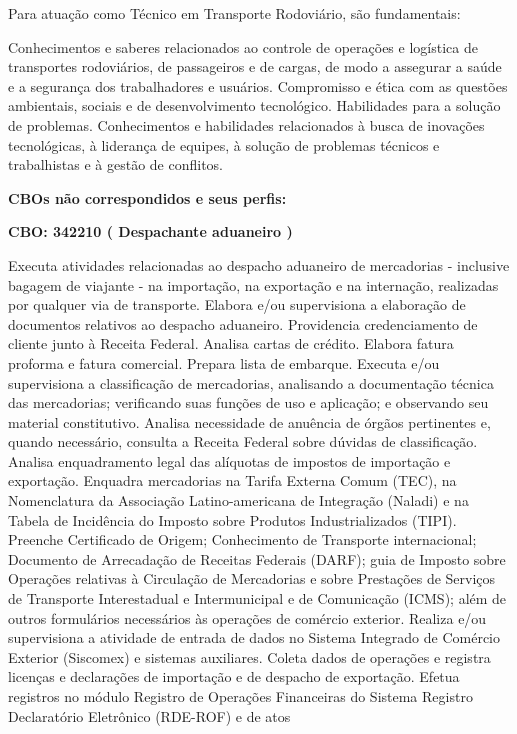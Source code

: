 \documentclass[
]{article}
\begin{document}
Para atuação como Técnico em Transporte Rodoviário, são fundamentais:

Conhecimentos e saberes relacionados ao controle de operações e
logística de transportes rodoviários, de passageiros e de cargas, de
modo a assegurar a saúde e a segurança dos trabalhadores e usuários.
Compromisso e ética com as questões ambientais, sociais e de
desenvolvimento tecnológico. Habilidades para a solução de problemas.
Conhecimentos e habilidades relacionados à busca de inovações
tecnológicas, à liderança de equipes, à solução de problemas técnicos e
trabalhistas e à gestão de conflitos.

\textbf{CBOs não correspondidos e seus perfis:}

\textbf{CBO: 342210  ( Despachante aduaneiro )}

Executa atividades relacionadas ao despacho aduaneiro de mercadorias -
inclusive bagagem de viajante - na importação, na exportação e na
internação, realizadas por qualquer via de transporte. Elabora e/ou
supervisiona a elaboração de documentos relativos ao despacho aduaneiro.
Providencia credenciamento de cliente junto à Receita Federal. Analisa
cartas de crédito. Elabora fatura proforma e fatura comercial. Prepara
lista de embarque. Executa e/ou supervisiona a classificação de
mercadorias, analisando a documentação técnica das mercadorias;
verificando suas funções de uso e aplicação; e observando seu material
constitutivo. Analisa necessidade de anuência de órgãos pertinentes e,
quando necessário, consulta a Receita Federal sobre dúvidas de
classificação. Analisa enquadramento legal das alíquotas de impostos de
importação e exportação. Enquadra mercadorias na Tarifa Externa Comum
(TEC), na Nomenclatura da Associação Latino-americana de Integração
(Naladi) e na Tabela de Incidência do Imposto sobre Produtos
Industrializados (TIPI). Preenche Certificado de Origem; Conhecimento de
Transporte internacional; Documento de Arrecadação de Receitas Federais
(DARF); guia de Imposto sobre Operações relativas à Circulação de
Mercadorias e sobre Prestações de Serviços de Transporte Interestadual e
Intermunicipal e de Comunicação (ICMS); além de outros formulários
necessários às operações de comércio exterior. Realiza e/ou supervisiona
a atividade de entrada de dados no Sistema Integrado de Comércio
Exterior (Siscomex) e sistemas auxiliares. Coleta dados de operações e
registra licenças e declarações de importação e de despacho de
exportação. Efetua registros no módulo Registro de Operações Financeiras
do Sistema Registro Declaratório Eletrônico (RDE-ROF) e de atos
\end{document}
